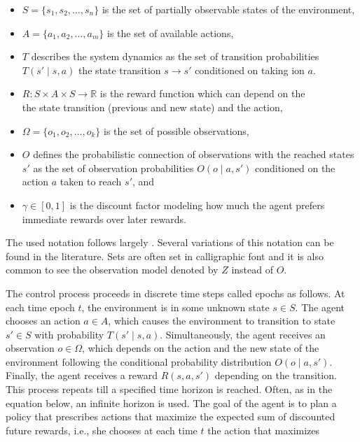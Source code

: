 \begin{itemize}
\tightlist
\item
  \(S = \{s_1, s_2, \dots, s_n\}\) is the set of partially observable states of the environment,
\item
  \(A = \{a_1, a_2, \dots, a_m\}\) is the set of available actions,
\item
  \(T\) describes the system dynamics as the set of transition probabilities \(T(s' \mid s,a)\)
  the state transition \(s \rightarrow s'\) conditioned on taking
  ion \(a\).
\item
  \(R: S \times A \times S \rightarrow \mathbb{R}\) is the reward function which can
  depend on the\\
  the state transition (previous and new state) and the action,
\item
  \(\Omega = \{o_1, o_2, \dots, o_k\}\) is the set of possible observations,
\item
  \(O\) defines the probabilistic connection of observations with the reached states \(s'\) as the set of observation probabilities \(O(o \mid a, s')\) conditioned on the action \(a\) taken to reach \(s'\), and
\item
  \(\gamma \in [0, 1]\) is the discount factor modeling how much the agent prefers immediate rewards over later rewards.
\end{itemize}

The used notation follows largely \citep{Kaelbling1998}. Several variations of
this notation can be found in the literature.
Sets are often set in calligraphic font and it is also common to see the
observation model denoted by \(Z\) instead of \(O\).

The control process proceeds in discrete time steps called epochs as follows.
At each time epoch \(t\), the environment is in some
unknown state \(s \in S\).
The agent chooses an action \(a \in A\), which causes the environment to
transition to state \(s' \in S\) with probability \(T(s' \mid s,a)\). Simultaneously, the agent receives an observation \(o \in \Omega\), which
depends on the action and the new state of the environment following
the conditional probability distribution \(O(o \mid a, s')\). Finally, the agent receives a reward \(R(s,a,s')\) depending on the transition. This
process repeats till a specified time horizon is reached. Often,
as in the equation below, an infinite horizon
is used.
The goal of the agent is to plan a policy that prescribes actions that
maximize the expected sum of discounted future rewards, i.e., she
chooses at each time \(t\) the action that maximizes

